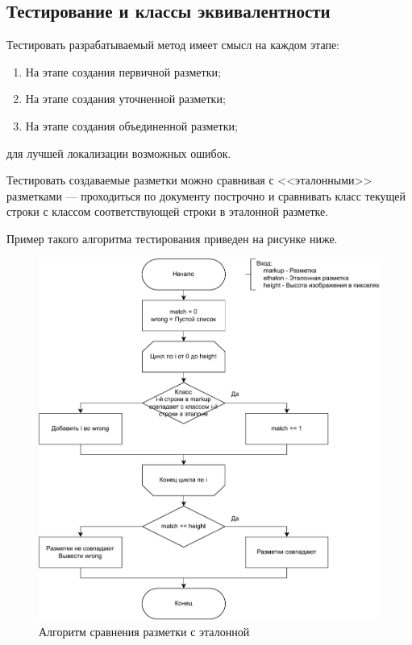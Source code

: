 


\subsection{Тестирование и классы эквивалентности}

Тестировать разрабатываемый метод имеет смысл на каждом этапе:
\begin{enumerate}
    \item На этапе создания первичной разметки;
    \item На этапе создания уточненной разметки;
    \item На этапе создания объединенной разметки;
\end{enumerate}
для лучшей локализации возможных ошибок.

Тестировать создаваемые разметки можно сравнивая с <<эталонными>> разметками --- проходиться по документу построчно и сравнивать класс текущей строки с классом соответствующей строки в эталонной разметке.

Пример такого алгоритма тестирования приведен на рисунке ниже.

\begin{figure}[H]
	\centering
    \includegraphics[width=\textwidth]{diag/vkr-test-primary.pdf}
	\caption{Алгоритм сравнения разметки с эталонной}
	\label{fig:test}
\end{figure}


